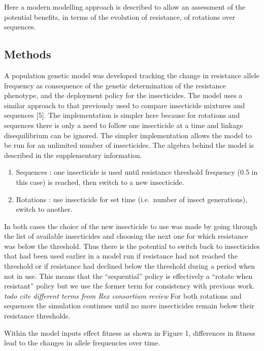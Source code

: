 \documentclass[11pt,]{article}
\begin{document}
Here a modern modelling approach is described to allow an assessment of
the potential benefits, in terms of the evolution of resistance, of
rotations over sequences.

\subsection{Methods}\label{methods}

A population genetic model was developed tracking the change in
resistance allele frequency as consequence of the genetic determination
of the resistance phenotype, and the deployment policy for the
insecticides. The model uses a similar approach to that previously used
to compare insecticide mixtures and sequences {[}5{]}. The
implementation is simpler here because for rotations and sequences there
is only a need to follow one insecticide at a time and linkage
disequilibrium can be ignored. The simpler implementation allows the
model to be run for an unlimited number of insecticides. The algebra
behind the model is described in the supplementary information.

\begin{enumerate}
\def\labelenumi{\arabic{enumi}.}
\item
  Sequences : one insecticide is used until resistance threshold
  frequency (0.5 in this case) is reached, then switch to a new
  insecticide.
\item
  Rotations : use insecticide for set time (i.e.~number of insect
  generations), switch to another.
\end{enumerate}

In both cases the choice of the new insecticide to use was made by going
through the list of available insecticides and choosing the next one for
which resistance was below the threshold. Thus there is the potential to
switch back to insecticides that had been used earlier in a model run if
resistance had not reached the threshold or if resistance had declined
below the threshold during a period when not in use. This means that the
``sequential'' policy is effectively a ``rotate when resistant'' policy
but we use the former term for consistency with previous work.
\emph{todo cite different terms from Rex consortium review} For both
rotations and sequences the simulation continues until no more
insecticides remain below their resistance thresholds.

Within the model inputs effect fitness as shown in Figure 1, differences
in fitness lead to the changes in allele frequencies over time.
\end{document}
